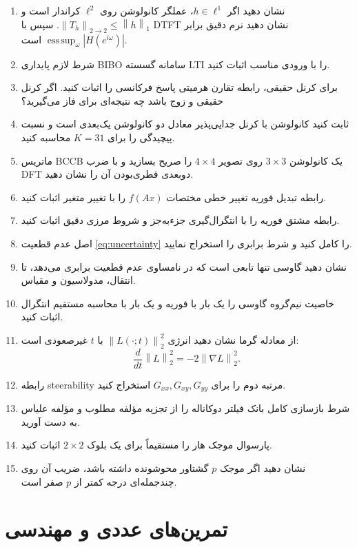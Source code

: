 \documentclass[12pt,openany,oneside]{book}
\newcommand{\norm}[1]{\left\lVert #1\right\rVert}
\newcommand{\esssup}{\operatorname*{ess\,sup}}
\begin{document}
\begin{enumerate}
\item نشان دهید اگر \(h\in\ell^1\)، عملگر کانولوشن روی \(\ell^2\) کراندار است و
\(\norm{T_h}_{2\to2}\le\norm h_1\). سپس با DTFT نشان دهید نرم دقیق برابر
\(\esssup_\omega|H(e^{i\omega})|\) است.
\item شرط لازم پایداری BIBO سامانه گسسته LTI را با ورودی مناسب اثبات کنید.
\item برای کرنل حقیقی، رابطه تقارن هرمیتی پاسخ فرکانسی را اثبات کنید. اگر کرنل حقیقی و زوج باشد چه نتیجه‌ای
برای فاز می‌گیرید؟
\item ثابت کنید کانولوشن با کرنل جدایی‌پذیر معادل دو کانولوشن یک‌بعدی است و نسبت پیچیدگی را برای
\(K=31\) محاسبه کنید.
\item ماتریس BCCB یک کانولوشن \(3\times3\) روی تصویر \(4\times4\) را صریح بسازید و با ضرب DFT
دوبعدی قطری‌بودن آن را نشان دهید.
\item رابطه تبدیل فوریه تغییر خطی مختصات \(f(Ax)\) را با تغییر متغیر اثبات کنید.
\item رابطه مشتق فوریه را با انتگرال‌گیری جزءبه‌جز و شروط مرزی دقیق اثبات کنید.
\item اصل عدم قطعیت \eqref{eq:uncertainty} را کامل کنید و شرط برابری را استخراج نمایید.
\item نشان دهید گاوسی تنها تابعی است که در نامساوی عدم قطعیت برابری می‌دهد، تا انتقال، مدولاسیون و مقیاس.
\item خاصیت نیم‌گروه گاوسی را یک بار با فوریه و یک بار با محاسبه مستقیم انتگرال اثبات کنید.
\item از معادله گرما نشان دهید انرژی \(\norm{L(\cdot;t)}_2^2\) با \(t\) غیرصعودی است:
\begin{equation}
\frac{d}{dt}\norm L_2^2=-2\norm{\nabla L}_2^2.
\end{equation}
\item رابطه steerability مرتبه دوم را برای \(G_{xx},G_{xy},G_{yy}\) استخراج کنید.
\item شرط بازسازی کامل بانک فیلتر دوکاناله را از تجزیه مؤلفه مطلوب و مؤلفه علیاس به دست آورید.
\item پارسوال موجک هار را مستقیماً برای یک بلوک \(2\times2\) اثبات کنید.
\item نشان دهید اگر موجک \(p\) گشتاور محوشونده داشته باشد، ضریب آن روی چندجمله‌ای درجه کمتر از \(p\)
صفر است.
\end{enumerate}

\section{تمرین‌های عددی و مهندسی}
\end{document}
